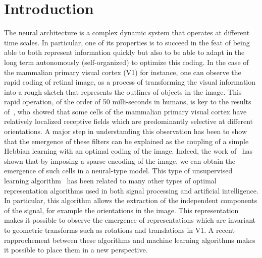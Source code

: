 \documentclass[a4paper, 11pt, draft]{article} %
\title{\Title}
\author{%
\FirstNameA\ \AuthorA \and \FirstNameB\ \AuthorB \and \FirstNameC\ \AuthorC
}
\date{\Institute\ \\ 
\Organism\
}
\newcommand{\Abstract}{
The formation of structure in the brain, that is, of the connection between cells within neural populations, is by large an unsupervised learning process: The emergence of this architecture is mostly self-organized. In the primary visual cortex of mammals, for example, one may observe during development the emergence of cells selective to localized, oriented features. This leads to the development of a rough representation of contours of the retinal image in area V1. A major difficulty in defining unsupervised learning algorithms is that during this process, on the one hand the coding is performed knowing an immature structure and on the other hand, the adaptation of this structure is carried out knowing a code that is not yet optimal. We propose here a fast algorithm compatible with a neuromimetic architecture which solves this problem and allows for the fast emergence of localized filters sensitive to orientation. The key to this algorithm lies in a simple yet optimal mechanism of homeostasis that reconciles the antagonistic processes that occur at the coding and learning time scales. We tested this unsupervised algorithm with this homeostasis rule for a range of existing unsupervised learning algorithms coupled with different neural coding algorithms. In addition, we propose a simplification of this optimal homeostasis rule by implementing a simple heuristic on the probability of activation of neurones. Compared to the optimal homeostasis rule, we show that this heuristic allows to implement an even faster unsupervised learning algorithm while keeping a large part of its effectiveness. These results demonstrate the potential application of such a strategy to the fast classification of images, for example in hierarchical and dynamic architectures.
}
\begin{document}
%
\maketitle
\begin{abstract}
\Abstract
\end{abstract}
\thispagestyle{empty}
\section{Introduction}\label{introduction}

The neural architecture is a complex dynamic system that operates at
different time scales. In particular, one of its properties is to
succeed in the feat of being able to both represent information quickly
but also to be able to adapt in the long term autonomously
(self-organized) to optimize this coding. In the case of the mammalian
primary visual cortex (V1) for instance, one can observe the rapid
coding of retinal image, as a process of transforming the visual
information into a rough sketch that represents the outlines of objects
in the image. This rapid operation, of the order of 50 milli-seconds in
humans, is key to the results of~\textcite{hubel1968receptive}, who showed that some
cells of the mammalian primary visual cortex have relatively localized
receptive fields which are predominantly selective at different
orientations. A major step in understanding this observation has been to
show that the emergence of these filters can be explained as the
coupling of a simple Hebbian learning with an optimal coding of the
image. Indeed, the work of~\textcite{olshausen1996emergence} has shown that by imposing a
sparse encoding of the image, we can obtain the emergence of such cells
in a neural-type model. This type of unsupervised learning algorithm~\citep{Olshausen97} has
been related to many other types of optimal representation algorithms
used in both signal processing and artificial intelligence. In
particular, this algorithm allows the extraction of the independent
components of the signal, for example the orientations in the image.
This representation makes it possible to observe the emergence of
representations which are invariant to geometric transforms such as
rotations and translations in V1. A recent rapprochement between these
algorithms and machine learning algorithms makes it possible to place
them in a new perspective. 
\end{document}
